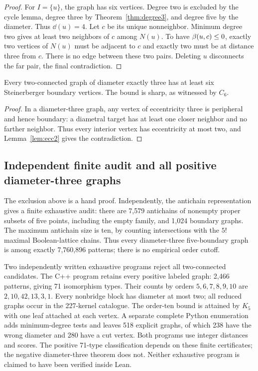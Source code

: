 \begin{proof}
For $I=\{u\}$, the graph has six vertices. Degree two is excluded by
the cycle lemma, degree three by Theorem~\ref{thm:degree3}, and degree
five by the diameter. Thus $\dd(u)=4$. Let $c$ be its unique nonneighbor.
Minimum degree two gives at least two neighbors of $c$ among $N(u)$.
To have $\beta(u,c)\le0$, exactly two vertices of $N(u)$ must be adjacent
to $c$ and exactly two must be at distance three from $c$.
There is no edge between these two pairs. Deleting $u$ disconnects the
far pair, the final contradiction.
\end{proof}

\begin{theorem}\label{thm:diamthree}
Every two-connected graph of diameter exactly three has at least six
Steinerberger boundary vertices. The bound is sharp, as witnessed by $C_6$.
\end{theorem}
\begin{proof}
In a diameter-three graph, any vertex of eccentricity three is peripheral
and hence boundary: a diametral target has at least one closer neighbor
and no farther neighbor. Thus every interior vertex has eccentricity at
most two, and Lemma~\ref{lem:ecc2} gives the contradiction.
\end{proof}

\subsection{Independent finite audit and all positive diameter-three graphs}
The exclusion above is a hand proof. Independently, the antichain
representation gives a finite exhaustive audit: there are 7,579 antichains
of nonempty proper subsets of five points, including the empty family,
and 1,024 boundary graphs. The maximum antichain size is ten, by counting
intersections with the $5!$ maximal Boolean-lattice chains. Thus every
diameter-three five-boundary graph is among exactly 7,760,896 patterns;
there is no empirical order cutoff.

Two independently written exhaustive programs reject all two-connected
candidates. The C++ program retains every positive labeled graph: 2,466
patterns, giving 71 isomorphism types. Their counts by orders
$5,6,7,8,9,10$ are $2,10,42,13,3,1$. Every nonbridge block has diameter
at most two; all reduced graphs occur in the 227-kernel catalogue.
The order-ten bound is attained by $K_5$ with one leaf attached at each
vertex. A separate complete Python enumeration adds minimum-degree tests
and leaves 518 explicit graphs, of which 238 have the wrong diameter and
280 have a cut vertex. Both programs use integer distances and scores.
The positive 71-type classification depends on these finite certificates;
the negative diameter-three theorem does not. Neither exhaustive program
is claimed to have been verified inside Lean.
